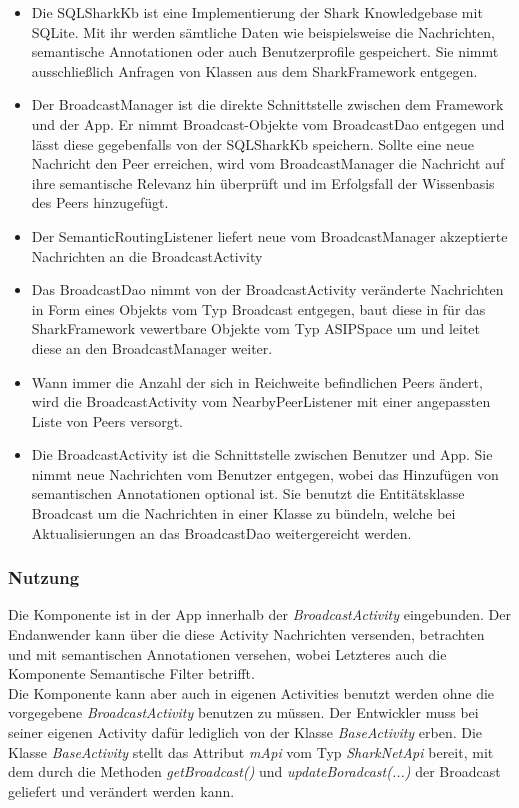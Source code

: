 \begin{itemize}
	\item Die SQLSharkKb ist eine Implementierung der Shark Knowledgebase mit SQLite. Mit ihr werden sämtliche Daten wie beispielsweise die Nachrichten, semantische Annotationen oder auch Benutzerprofile gespeichert. Sie nimmt ausschließlich Anfragen von Klassen aus dem SharkFramework entgegen.
	\item Der BroadcastManager ist die direkte Schnittstelle zwischen dem Framework und der App. Er nimmt Broadcast-Objekte vom BroadcastDao entgegen und lässt diese gegebenfalls von der SQLSharkKb speichern. Sollte eine neue Nachricht den Peer erreichen, wird vom BroadcastManager die Nachricht auf ihre semantische Relevanz hin überprüft und im Erfolgsfall der Wissenbasis des Peers hinzugefügt.
	\item Der SemanticRoutingListener liefert neue vom BroadcastManager akzeptierte Nachrichten an die BroadcastActivity
	\item Das BroadcastDao nimmt von der BroadcastActivity veränderte Nachrichten in Form eines Objekts vom Typ Broadcast entgegen, baut diese in für das SharkFramework vewertbare Objekte vom Typ ASIPSpace um und leitet diese an den BroadcastManager weiter.
	\item Wann immer die Anzahl der sich in Reichweite befindlichen Peers ändert, wird die BroadcastActivity vom NearbyPeerListener mit einer angepassten Liste von Peers versorgt.
	\item Die BroadcastActivity ist die Schnittstelle zwischen Benutzer und App. Sie nimmt neue Nachrichten vom Benutzer entgegen, wobei das Hinzufügen von semantischen Annotationen optional ist. Sie benutzt die Entitätsklasse Broadcast um die Nachrichten in einer Klasse zu bündeln, welche bei Aktualisierungen an das BroadcastDao weitergereicht werden. 
\end{itemize}


\subsubsection{Nutzung}
Die Komponente ist in der App innerhalb der \textit{BroadcastActivity} eingebunden. Der Endanwender kann über die diese Activity Nachrichten versenden, betrachten und mit semantischen Annotationen versehen, wobei Letzteres auch die Komponente Semantische Filter betrifft.
\\Die Komponente kann aber auch in eigenen Activities benutzt werden ohne die vorgegebene \textit{BroadcastActivity} benutzen zu müssen. Der Entwickler muss bei seiner eigenen Activity dafür lediglich von der Klasse \textit{BaseActivity} erben. Die Klasse \textit{BaseActivity} stellt das Attribut \textit{mApi} vom Typ \textit{SharkNetApi} bereit, mit dem durch die Methoden \textit{getBroadcast()} und \textit{updateBoradcast(...)} der Broadcast geliefert und verändert werden kann.
\\

